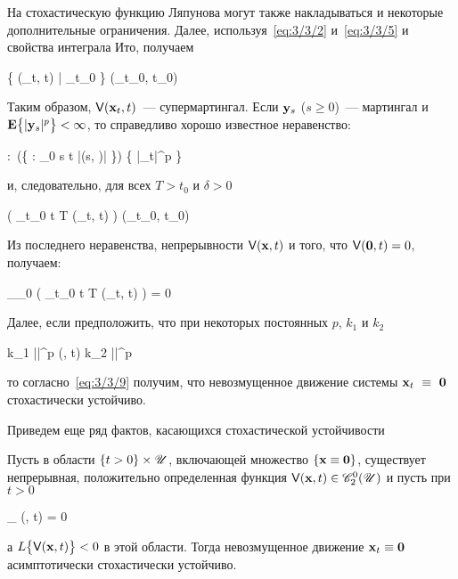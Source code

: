 На стохастическую функцию Ляпунова могут также накладываться и некоторые дополнительные ограничения. Далее, используя~\ref{eq:3/3/2} и~\ref{eq:3/3/5} и свойства интеграла Ито, получаем

    \E \bigl\{ \funcV(_t, t) \bigm| \funcF_{t_0} \bigr\} \leqslant \funcV(_{t_0}, t_0) 
\eeq

Таким образом, $\mathsf{V}(\mathbf{x}_t, t)$~--- супермартингал. Если $\mathbf{y}_s$ ($s \geqslant 0$)~--- мартингал и $\mathbf{E} \bigl\{ |\mathbf{y}_s|^p \bigr\} < \infty$, то справедливо хорошо известное неравенство:

    \forall \alpha:~\prob\Biggl(\bigl\{ \omega \in \Omega : \sup\limits_{0 \leqslant s \leqslant t} |(s, \omega)| \geqslant \alpha \bigr\}\Biggr) \leqslant {} \E \bigl\{ |_t|^p \bigr\}
\eeq

и, следовательно, для всех $T > t_0$ и $\delta > 0$

    \prob\Biggl( \sup\limits_{t_0 \leqslant t \leqslant T} \funcV(_t, t) \geqslant \delta \Biggr) \leqslant {} \funcV(_{t_0}, t_0) 
\eeq

Из последнего неравенства, непрерывности $\mathsf{V}(\mathbf{x}, t)$ и того, что $\mathsf{V}(\mathbf{0}, t) = 0$, получаем:

    \lim\limits_{_0 \to {}} \prob\Biggl( \sup\limits_{t_0 \leqslant t \leqslant T} \funcV(_t, t) \geqslant \delta \Biggr) = 0 
\eeq

Далее, если предположить, что при некоторых постоянных $p$, $k_1$ и $k_2$

    k_1 ||^p \leqslant \funcV(, t) \leqslant k_2 ||^p \text{,}
\eeq

то согласно~\ref{eq:3/3/9} получим, что невозмущенное движение системы $\mathbf{x}_t~\equiv~\mathbf{0}$ стохастически устойчиво.

\br

Приведем еще ряд фактов\cite{HASMINSKI}, касающихся стохастической устойчивости

    Пусть в области $\{ t > 0 \} \times \mathscr{U}$, включающей множество $\{ \mathbf{x} \equiv \mathbf{0} \}$, существует непрерывная, положительно определенная функция $\mathsf{V}(\mathbf{x}, t) \in \mathscr{C}_2^0(\mathscr{U})$ и пусть при $t > 0$

        \beqn
            \limsup\limits_{ \to {}} \funcV(, t) = 0 \text{,}
        \eeqn

        а $L\bigl\{ \mathsf{V}(\mathbf{x}, t) \bigr\} < 0$ в этой области. Тогда невозмущенное движение $\mathbf{x}_t \equiv \mathbf{0}$ асимптотически стохастически устойчиво.
\eteo

